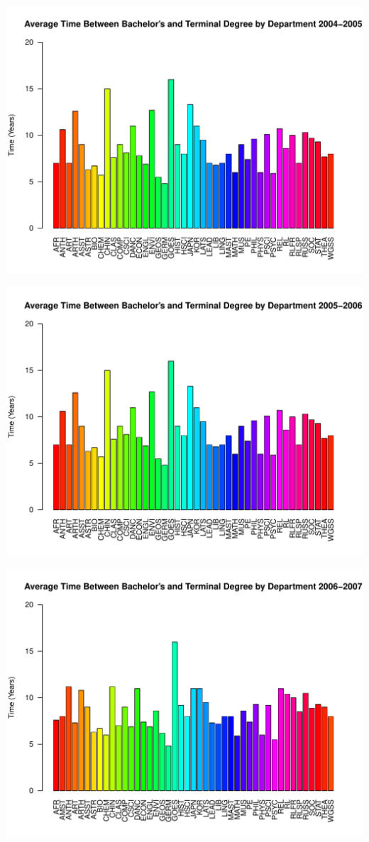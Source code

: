 \documentclass[12pt,a4paper]{article}\usepackage[]{graphicx}\usepackage[]{color}
\makeatletter
\def\maxwidth{ %
  \ifdim\Gin@nat@width>\linewidth
    \linewidth
  \else
    \Gin@nat@width
  \fi
}
\newenvironment{knitrout}{}{} %
\theoremstyle{definition}
\makeatother
\begin{document}
\begin{knitrout}
\color{fgcolor}
\includegraphics[width=\maxwidth]{figure/unnamed-chunk-13-1} 

\includegraphics[width=\maxwidth]{figure/unnamed-chunk-13-2} 

\includegraphics[width=\maxwidth]{figure/unnamed-chunk-13-3} 


\end{knitrout}
\end{document}

